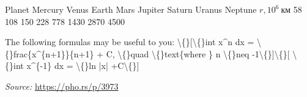 \documentclass[11pt,a4paper]{article}
\begin{document}
Planet Mercury Venus Earth Mars Jupiter Saturn Uranus Neptune $r, 10^6~\text{км}$ 58 108 150 228 778 1430 2870 4500

The following formulas may be useful to you: \textbackslash\{\}[\textbackslash\{\}int x^n dx = \textbackslash\{\}frac\{x^\{n+1\}\}\{n+1\} + C, \textbackslash\{\}quad \textbackslash\{\}text\{where \} n \textbackslash\{\}neq -1\textbackslash\{\}]\textbackslash\{\}[ \textbackslash\{\}int x^\{-1\} dx = \textbackslash\{\}ln |x| +C\textbackslash\{\}]

\vspace{1em}
\noindent\textit{Source:} \url{https://pho.rs/p/3973}
\end{document}
